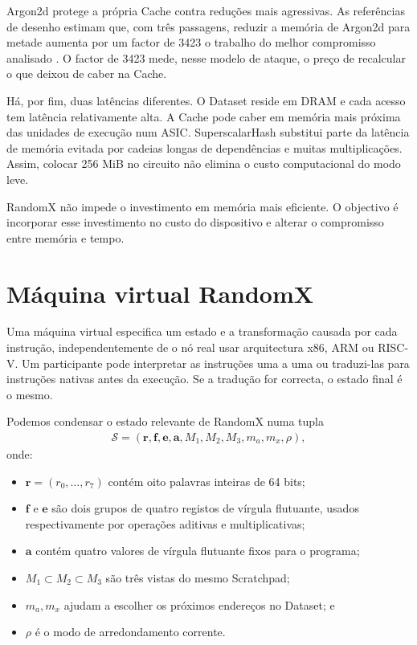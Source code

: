 Argon2d protege a própria Cache contra reduções mais agressivas. As referências
de desenho estimam que, com três passagens, reduzir a memória de Argon2d para
metade aumenta por um factor de 3423 o trabalho do melhor compromisso analisado
\cite{memory-hard-tradeoffs,randomx-design-v1}. O factor de 3423 mede,
nesse modelo de ataque, o preço de recalcular o que deixou de caber na Cache.

Há, por fim, duas latências diferentes. O Dataset reside em DRAM e cada acesso
tem latência relativamente alta. A Cache pode caber em memória mais próxima
das unidades de execução num ASIC. SuperscalarHash substitui parte da latência
de memória evitada por cadeias longas de dependências e muitas multiplicações.
Assim, colocar 256 MiB no circuito não elimina o custo computacional do modo
leve.

RandomX não impede o investimento em memória mais eficiente. O objectivo é
incorporar esse investimento no custo do dispositivo e alterar o compromisso
entre memória e tempo.


\section{Máquina virtual RandomX}
\label{sec:randomx-vm}

Uma máquina virtual especifica um estado e a transformação causada por cada
instrução, independentemente de o nó real usar arquitectura x86, ARM ou
RISC-V. Um participante pode interpretar as instruções uma a uma ou traduzi-las
para instruções nativas antes da execução. Se a tradução for correcta, o
estado final é o mesmo.

Podemos condensar o estado relevante de RandomX numa tupla
\begin{align}
 \mathcal S=
 (\mathbf r,\mathbf f,\mathbf e,\mathbf a,
  M_1,M_2,M_3,m_a,m_x,\rho),
 \label{eq:randomx-vm-state}
\end{align}
onde:
\begin{itemize}
 \item \(\mathbf r=(r_0,\ldots,r_7)\) contém oito palavras inteiras de 64
 bits;
 \item \(\mathbf f\) e \(\mathbf e\) são dois grupos de quatro registos de
 vírgula flutuante, usados respectivamente por operações aditivas e
 multiplicativas;
 \item \(\mathbf a\) contém quatro valores de vírgula flutuante fixos para o
 programa;
 \item \(M_1\subset M_2\subset M_3\) são três vistas do mesmo Scratchpad;
 \item \(m_a,m_x\) ajudam a escolher os próximos endereços no Dataset; e
 \item \(\rho\) é o modo de arredondamento corrente.
\end{itemize}

